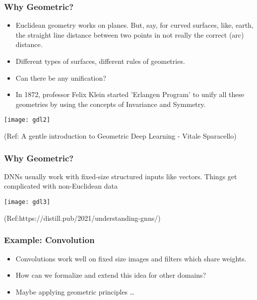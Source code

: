 \begin{frame}[fragile]\frametitle{Why Geometric?}

\begin{itemize}
\item Euclidean geometry works on planes. But, say, for curved surfaces, like, earth, the straight line distance between two points in not really the correct (arc) distance.
\item Different types of surfaces, different rules of geometries.
\item Can there be any unification?
\item In 1872, professor Felix Klein started 'Erlangen Program' to unify all these geometries by using the concepts of Invariance and Symmetry.
\end{itemize}
	  
\begin{center}
\texttt{[image: gdl2]}
\end{center}

{\tiny (Ref: A gentle introduction to Geometric Deep Learning - Vitale Sparacello)}

\end{frame}

\begin{frame}[fragile]\frametitle{Why Geometric?}

DNNs usually work with fixed-size structured inputs like vectors. Things get complicated with non-Euclidean data
	  
\begin{center}
\texttt{[image: gdl3]}
\end{center}

{\tiny (Ref:https://distill.pub/2021/understanding-gnns/)}

\end{frame}

\begin{frame}[fragile]\frametitle{Example: Convolution}

\begin{itemize}
\item Convolutions work well on fixed size images and filters which share weights.
\item How can we formalize and extend this idea for other domains? 
\item Maybe applying geometric principles \ldots
\end{itemize}
	  
\end{frame}

